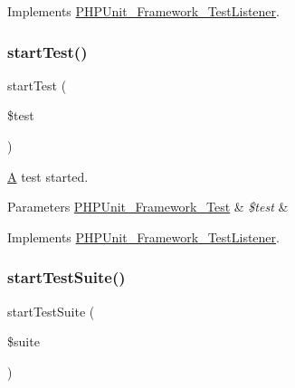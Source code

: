 Implements \mbox{\hyperlink{interface_p_h_p_unit___framework___test_listener_aeec28a4d1328434916ebcdc1ca6b5527}{P\+H\+P\+Unit\+\_\+\+Framework\+\_\+\+Test\+Listener}}.

\mbox{\label{class_p_h_p_unit___util___log___t_a_p_a1a9bddc54f26bb3fb5c2ec9778ea5198}} 
\subsubsection{\texorpdfstring{start\+Test()}{startTest()}}
{\footnotesize\ttfamily start\+Test (\begin{DoxyParamCaption}\item[{\mbox{\hyperlink{interface_p_h_p_unit___framework___test}{P\+H\+P\+Unit\+\_\+\+Framework\+\_\+\+Test}}}]{\$test }\end{DoxyParamCaption})}

\mbox{\hyperlink{class_a}{A}} test started.


\begin{DoxyParams}[1]{Parameters}
\mbox{\hyperlink{interface_p_h_p_unit___framework___test}{P\+H\+P\+Unit\+\_\+\+Framework\+\_\+\+Test}} & {\em \$test} & \\
\hline
\end{DoxyParams}


Implements \mbox{\hyperlink{interface_p_h_p_unit___framework___test_listener_a1a9bddc54f26bb3fb5c2ec9778ea5198}{P\+H\+P\+Unit\+\_\+\+Framework\+\_\+\+Test\+Listener}}.

\mbox{\label{class_p_h_p_unit___util___log___t_a_p_a901a86a623d83184267b21f2daee0ff5}} 
\subsubsection{\texorpdfstring{start\+Test\+Suite()}{startTestSuite()}}
{\footnotesize\ttfamily start\+Test\+Suite (\begin{DoxyParamCaption}\item[{\mbox{\hyperlink{class_p_h_p_unit___framework___test_suite}{P\+H\+P\+Unit\+\_\+\+Framework\+\_\+\+Test\+Suite}}}]{\$suite }\end{DoxyParamCaption})}

